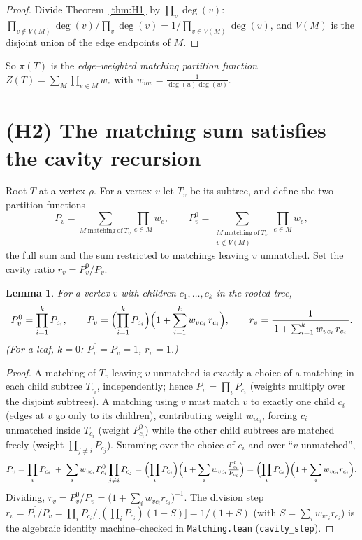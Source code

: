 \documentclass[11pt]{article}
\newtheorem{lemma}[theorem]{Lemma}
\begin{document}
\begin{proof}
Divide Theorem~\ref{thm:H1} by $\prod_v\deg(v)$: $\prod_{v\notin V(M)}\deg(v)/\prod_v\deg(v)
=1/\prod_{v\in V(M)}\deg(v)$, and $V(M)$ is the disjoint union of the edge endpoints of $M$.
\end{proof}

So $\pi(T)$ is the \emph{edge--weighted matching partition function} $Z(T)=\sum_M\prod_{e\in M}w_e$ with
$w_{uw}=\tfrac1{\deg(u)\deg(w)}$.

\section{(H2) The matching sum satisfies the cavity recursion}

Root $T$ at a vertex $\rho$. For a vertex $v$ let $T_v$ be its subtree, and define the two partition functions
\[
  P_v=\sum_{M\ \mathrm{matching\ of}\ T_v}\prod_{e\in M}w_e,\qquad
  P_v^{0}=\sum_{\substack{M\ \mathrm{matching\ of}\ T_v\\ v\notin V(M)}}\prod_{e\in M}w_e,
\]
the full sum and the sum restricted to matchings leaving $v$ unmatched. Set the cavity ratio
$r_v=P_v^{0}/P_v$.

\begin{lemma}\label{lem:cavity}
For a vertex $v$ with children $c_1,\dots,c_k$ in the rooted tree,
\[
  P_v^{0}=\prod_{i=1}^{k}P_{c_i},\qquad
  P_v=\Bigl(\prod_{i=1}^{k}P_{c_i}\Bigr)\Bigl(1+\sum_{i=1}^{k}w_{vc_i}\,r_{c_i}\Bigr),\qquad
  r_v=\frac{1}{\,1+\sum_{i=1}^{k}w_{vc_i}\,r_{c_i}\,}.
\]
(For a leaf, $k=0$: $P_v^0=P_v=1$, $r_v=1$.)
\end{lemma}

\begin{proof}
A matching of $T_v$ leaving $v$ unmatched is exactly a choice of a matching in each child subtree $T_{c_i}$,
independently; hence $P_v^{0}=\prod_i P_{c_i}$ (weights multiply over the disjoint subtrees). A matching using
$v$ must match $v$ to exactly one child $c_i$ (edges at $v$ go only to its children), contributing weight
$w_{vc_i}$, forcing $c_i$ unmatched inside $T_{c_i}$ (weight $P_{c_i}^{0}$) while the other child subtrees are
matched freely (weight $\prod_{j\neq i}P_{c_j}$). Summing over the choice of $c_i$ and over ``$v$ unmatched'',
\[
  P_v=\prod_i P_{c_i}\;+\;\sum_i w_{vc_i}P_{c_i}^{0}\prod_{j\neq i}P_{c_j}
     =\Bigl(\prod_i P_{c_i}\Bigr)\Bigl(1+\sum_i w_{vc_i}\tfrac{P_{c_i}^{0}}{P_{c_i}}\Bigr)
     =\Bigl(\prod_i P_{c_i}\Bigr)\Bigl(1+\sum_i w_{vc_i}r_{c_i}\Bigr).
\]
Dividing, $r_v=P_v^0/P_v=\bigl(1+\sum_i w_{vc_i}r_{c_i}\bigr)^{-1}$. The division step
$r_v=P_v^0/P_v=\prod_iP_{c_i}\big/\bigl[(\prod_iP_{c_i})(1+S)\bigr]=1/(1+S)$ (with $S=\sum_iw_{vc_i}r_{c_i}$)
is the algebraic identity machine--checked in \texttt{Matching.lean} (\texttt{cavity\_step}).
\end{proof}
\end{document}
